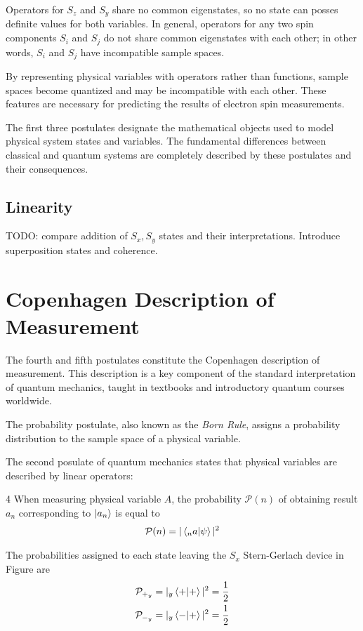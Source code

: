 Operators for $S_z$ and $S_y$ share no common eigenstates, so no state can posses definite values for both variables. In general, operators for any two spin components $S_i$ and $S_j$ do not share common eigenstates with each other; in other words, $S_i$ and $S_j$ have incompatible sample spaces.

By representing physical variables with operators rather than functions, sample spaces become quantized and may be incompatible with each other. These features are necessary for predicting the results of electron spin measurements.

The first three postulates designate the mathematical objects used to model physical system states and variables. The fundamental differences between classical and quantum systems are completely described by these postulates and their consequences.

\subsection{Linearity}
TODO: compare addition of $S_x, S_y$ states and their interpretations. Introduce superposition states and coherence.

\section{Copenhagen Description of Measurement}
The fourth and fifth postulates constitute the Copenhagen description of measurement. This description is a key component of the standard interpretation of quantum mechanics, taught in textbooks and introductory quantum courses worldwide.

The probability postulate, also known as the \textit{Born Rule}, assigns a probability distribution to the sample space of a physical variable.

The second posulate of quantum mechanics states that physical variables are described by linear operators:
\begin{Thm:Postulate}{4}
    When measuring physical variable $A$, the probability $\mathcal{P}(n)$ of obtaining result $a_n$ corresponding to $\ket{a_n}$  is equal to
     \begin{align}
        \mathcal{P}(n) = |\braket{_na|\psi}|^2
    \end{align}
\end{Thm:Postulate}

The probabilities assigned to each state leaving the $S_x$ Stern-Gerlach device in Figure  are
\begin{align}
    \mathcal{P}_{+_y} &= |_y\braket{+|+}|^2 = \frac{1}{2} \\
    \mathcal{P}_{-_y} &= |_y\braket{-|+}|^2 = \frac{1}{2}
\end{align}

